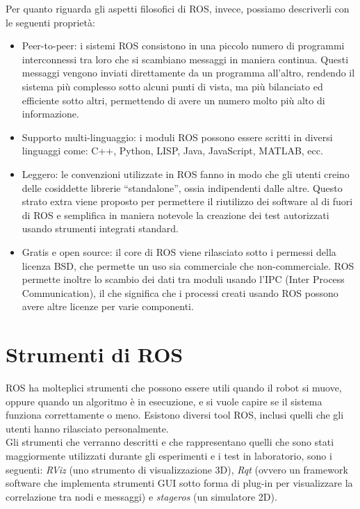 Per quanto riguarda gli aspetti filosofici di ROS, invece, possiamo descriverli con le seguenti proprietà:
\begin{itemize} 
\item Peer-to-peer: i sistemi ROS consistono in una piccolo numero di programmi interconnessi tra loro che si scambiano messaggi in maniera continua. Questi messaggi vengono inviati direttamente da un programma all’altro, rendendo il sistema più complesso sotto alcuni punti di vista, ma più bilanciato ed efficiente sotto altri, permettendo di avere un numero molto più alto di informazione.
\item Supporto multi-linguaggio: i moduli ROS possono essere scritti in diversi linguaggi come: C++, Python, LISP, Java, JavaScript, MATLAB, ecc. 
\item Leggero: le convenzioni utilizzate in ROS fanno in modo che gli utenti creino delle cosiddette librerie ``standalone'', ossia indipendenti dalle altre. Questo strato extra viene proposto per permettere il riutilizzo dei software al di fuori di ROS e semplifica in maniera notevole la creazione dei test autorizzati usando strumenti integrati standard.
\item Gratis e open source: il core di ROS viene rilasciato sotto i permessi della licenza BSD, che permette un uso sia commerciale che non-commerciale. ROS permette inoltre lo scambio dei dati tra moduli usando l’IPC (Inter Process Communication), il che significa che i processi creati usando ROS possono avere altre licenze per varie componenti.
\end{itemize}

\section{Strumenti di ROS}

ROS ha molteplici strumenti che possono essere utili quando il robot si muove, oppure quando un algoritmo è in esecuzione, e si vuole capire se il sistema funziona correttamente o meno. Esistono diversi tool ROS, inclusi quelli che gli utenti hanno rilasciato personalmente.\\
Gli strumenti che verranno descritti e che rappresentano quelli che sono stati maggiormente utilizzati durante gli esperimenti e i test in laboratorio, sono i seguenti: \textit{RViz} (uno strumento di visualizzazione 3D), \textit{Rqt} (ovvero un framework software che implementa strumenti GUI sotto forma di plug-in per visualizzare la correlazione tra nodi e messaggi) e \textit{stageros} (un simulatore 2D).


